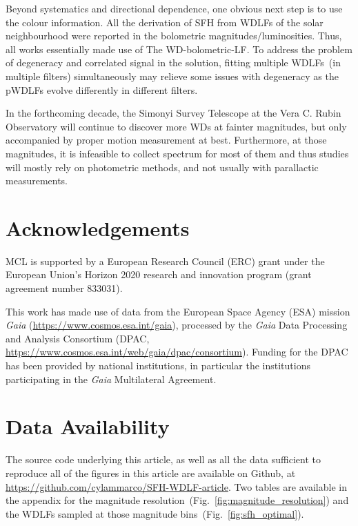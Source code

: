 \documentclass[fleqn,usenatbib]{mnras}
\begin{document}
Beyond systematics and directional dependence, one obvious next step is to use
the colour information. All the derivation of SFH from WDLFs of the solar 
neighbourhood were reported in the bolometric magnitudes/luminosities. Thus,
all works essentially made use of The WD-bolometric-LF. To address the problem
of degeneracy and correlated signal in the solution, fitting multiple WDLFs~(in 
multiple filters) simultaneously may relieve some issues with degeneracy as the
pWDLFs evolve differently in different filters.

In the forthcoming decade, the Simonyi Survey Telescope at the Vera C. Rubin
Observatory will continue to discover more WDs at fainter magnitudes, but only
accompanied by proper motion measurement at best. Furthermore, at those
magnitudes, it is infeasible to collect spectrum for most of them and thus
studies will mostly rely on photometric methods, and not usually with
parallactic measurements.

\section*{Acknowledgements}
MCL is supported by a European Research Council (ERC) grant under the European
Union’s Horizon 2020 research and innovation program (grant agreement number
833031).

This work has made use of data from the European Space Agency (ESA) mission
{\it Gaia} (\url{https://www.cosmos.esa.int/gaia}), processed by the {\it Gaia}
Data Processing and Analysis Consortium (DPAC,
\url{https://www.cosmos.esa.int/web/gaia/dpac/consortium}). Funding for the DPAC
has been provided by national institutions, in particular the institutions
participating in the {\it Gaia} Multilateral Agreement.


\section*{Data Availability}
The source code underlying this article, as well as all the data sufficient to reproduce all of the figures in this article are available on Github, at \url{https://github.com/cylammarco/SFH-WDLF-article}. Two tables are available in the appendix for the magnitude resolution~(Fig.~\ref{fig:magnitude_resolution}) and the WDLFs sampled at those magnitude bins~(Fig.~\ref{fig:sfh_optimal}).
\end{document}
